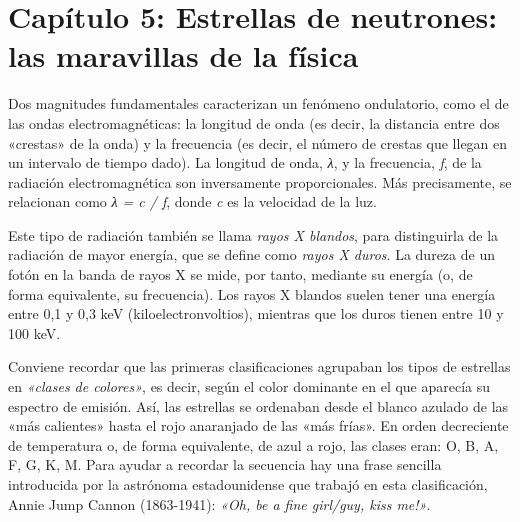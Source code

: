 \section*{Capítulo 5: Estrellas de neutrones: las maravillas de la física}
\begin{description}[style=multiline,leftmargin=2em,labelwidth=1.5em]

\item[1.]\hypertarget{note:05-01}{}Dos magnitudes fundamentales caracterizan un fenómeno ondulatorio, como el de las ondas electromagnéticas: la longitud de onda (es decir, la distancia entre dos «crestas» de la onda) y la frecuencia (es decir, el número de crestas que llegan en un intervalo de tiempo dado). La longitud de onda, \emph{λ}, y la frecuencia, \emph{f}, de la radiación electromagnética son inversamente proporcionales. Más precisamente, se relacionan como \emph{λ = c / f}, donde \emph{c} es la velocidad de la luz.

\item[2.]\hypertarget{note:05-02}{}Este tipo de radiación también se llama \emph{rayos X blandos}, para distinguirla de la radiación de mayor energía, que se define como \emph{rayos X duros}. La dureza de un fotón en la banda de rayos X se mide, por tanto, mediante su energía (o, de forma equivalente, su frecuencia). Los rayos X blandos suelen tener una energía entre 0,1 y 0,3 keV (kiloelectronvoltios), mientras que los duros tienen entre 10 y 100 keV.

\item[3.]\hypertarget{note:05-03}{}Conviene recordar que las primeras clasificaciones agrupaban los tipos de estrellas en \emph{«clases de colores»}, es decir, según el color dominante en el que aparecía su espectro de emisión. Así, las estrellas se ordenaban desde el blanco azulado de las «más calientes» hasta el rojo anaranjado de las «más frías». En orden decreciente de temperatura o, de forma equivalente, de azul a rojo, las clases eran: O, B, A, F, G, K, M. Para ayudar a recordar la secuencia hay una frase sencilla introducida por la astrónoma estadounidense que trabajó en esta clasificación, Annie Jump Cannon (1863-1941): \emph{«Oh, be a fine girl/guy, kiss me!»}.


\end{description}
